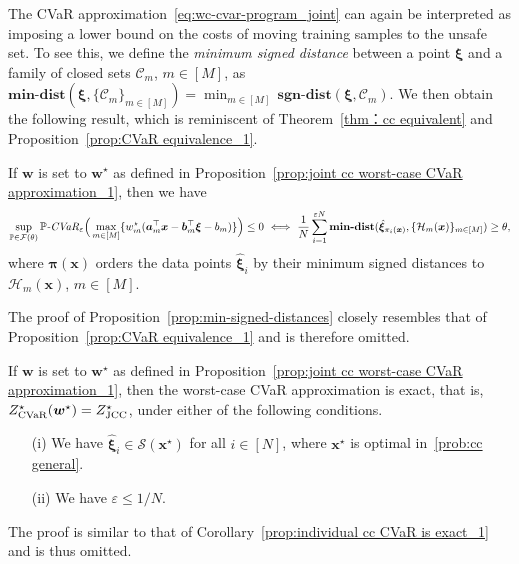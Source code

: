 \documentclass[nonblindrev]{informs2017}
\newcommand{\bmh}[1]{\hat{\bm{#1}}}
\newcommand{\1}[1]{\mathds{1}{\left(#1\right)}}
\begin{document}
The CVaR approximation~\eqref{eq:wc-cvar-program_joint} can again be interpreted as imposing a lower bound on the costs of moving training samples to the unsafe set. To see this, we define the \emph{minimum signed distance} between a point $\bm{\xi}$ and a family of closed sets $\mathcal{C}_m$, $m \in [M]$, as $\mathbf{min\textbf{-}dist} (\bm{\xi}, \{ \mathcal{C}_m \}_{m \in [M]}) = \min_{m \in [M]} \, \mathbf{sgn\textbf{-}dist} (\bm{\xi}, \mathcal{C}_m)$. We then obtain the following result, which is reminiscent of Theorem~\ref{thm：cc equivalent} and Proposition~\ref{prop:CVaR equivalence_1}.

\begin{proposition}\label{prop:min-signed-distances}
If $\bm w$ is set to $\bm w^\star$ as defined in Proposition~\ref{prop:joint cc worst-case CVaR approximation_1}, then we have
$$
\sup_{\mathbb{P} \in \mathcal{F}(\theta)} \mathbb{P}\text{\emph{-CVaR}}_{\varepsilon}\Big(\max_{m \in [M]}\{w_m^\star (\bm{a}^\top_m\bm{x} - \bm{b}^\top_m\bm{\xi} - b_m)\}\Big) \leq 0
~\Longleftrightarrow~ 
\dfrac{1}{N}\sum_{i = 1}^{\varepsilon N} \mathbf{min\textbf{-}dist} (\bmh{\xi}_{\pi_i(\bm{x})}, \{ \mathcal{H}_m(\bm{x}) \}_{m \in [M]} ) \ge \theta,
$$
where $\bm{\pi}(\bm{x})$ orders the data points $\bmh{\xi}_i$ by their minimum signed distances to $\mathcal{H}_m(\bm{x})$, $m \in [M]$.
\end{proposition}

The proof of Proposition~\ref{prop:min-signed-distances} closely resembles that of Proposition~\ref{prop:CVaR equivalence_1} and is therefore omitted.

\begin{corollary}\label{prop:joint cc CVaR is exact_1}
If $\bm w$ is set to $\bm w^\star$ as defined in Proposition~\ref{prop:joint cc worst-case CVaR approximation_1}, then the worst-case CVaR approximation is exact, that is, $Z^\star_{\rm CVaR}(\bm{w}^\star) = Z^\star_{\rm JCC}$, under either of the following conditions. 
\begin{itemize}
\item[(i)] We have $\bmh{\xi}_i \in \mathcal{S}(\bm{x}^\star)$ for all $i \in [N]$, where $\bm{x}^\star$ is optimal in~\eqref{prob:cc general}.
\item[(ii)] We have $\varepsilon \leq 1/N$. 
\end{itemize}
\end{corollary}

The proof is similar to that of Corollary~\ref{prop:individual cc CVaR is exact_1} and is thus omitted. 
\end{document}
